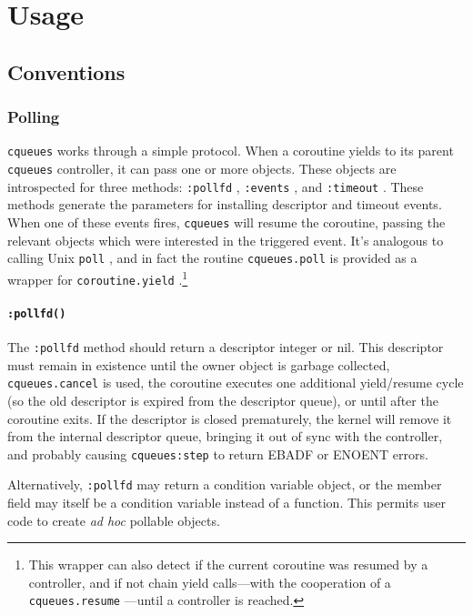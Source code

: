 \documentclass[11pt, oneside]{memoir}
\newcommand{\cqueues}[0]{\texttt{cqueues} }
\newcommand{\syscall}[1]{\texttt{#1} }
\newcommand{\routine}[1]{\texttt{#1} }
\newcommand{\method}[1]{\texttt{#1} }
\begin{document}
\chapter{Usage}

\section{Conventions}

\subsection{Polling}

\cqueues works through a simple protocol. When a coroutine yields to its parent \cqueues controller, it can pass one or more objects. These objects are introspected for three methods: \method{:pollfd}, \method{:events}, and \method{:timeout}. These methods generate the parameters for installing descriptor and timeout events. When one of these events fires, \cqueues will resume the coroutine, passing the relevant objects which were interested in the triggered event. It's analogous to calling Unix \syscall{poll}, and in fact the routine \routine{cqueues.poll} is provided as a wrapper for \routine{coroutine.yield}.\footnote{This wrapper can also detect if the current coroutine was resumed by a controller, and if not chain yield calls---with the cooperation of a \routine{cqueues.resume}---until a controller is reached.}

\subsubsection[\method{object:pollfd}]{\method{:pollfd()}} The \method{:pollfd} method should return a descriptor integer or nil. This descriptor must remain in existence until the owner object is garbage collected, \routine{cqueues.cancel} is used, the coroutine executes one additional yield/resume cycle (so the old descriptor is expired from the descriptor queue), or until after the coroutine exits. If the descriptor is closed prematurely, the kernel will remove it from the internal descriptor queue, bringing it out of sync with the controller, and probably causing \method{cqueues:step} to return EBADF or ENOENT errors.

Alternatively, \method{:pollfd} may return a condition variable object, or the member field may itself
be a condition variable instead of a function. This permits user code to create \textit{ad hoc} pollable objects.
\end{document}
